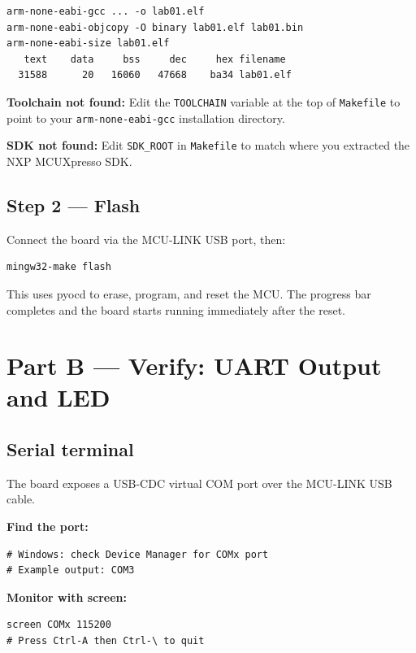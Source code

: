\documentclass[11pt, a4paper]{article}
\newcommand{\file}[1]{\texttt{\small #1}}
\begin{document}
\begin{lstlisting}[style=textstyle]
arm-none-eabi-gcc ... -o lab01.elf
arm-none-eabi-objcopy -O binary lab01.elf lab01.bin
arm-none-eabi-size lab01.elf
   text    data     bss     dec     hex filename
  31588      20   16060   47668    ba34 lab01.elf
\end{lstlisting}

\begin{warnbox}
  \textbf{Toolchain not found:} Edit the \texttt{TOOLCHAIN} variable at the top of
  \file{Makefile} to point to your \texttt{arm-none-eabi-gcc} installation directory.

  \medskip
  \textbf{SDK not found:} Edit \texttt{SDK\_ROOT} in \file{Makefile} to match
  where you extracted the NXP MCUXpresso SDK.
\end{warnbox}

\subsection{Step 2 --- Flash}

Connect the board via the MCU-LINK USB port, then:

\begin{lstlisting}[style=bashstyle]
mingw32-make flash
\end{lstlisting}

This uses pyocd to erase, program, and reset the MCU.
The progress bar completes and the board starts running immediately after the reset.

\section{Part B --- Verify: UART Output and LED}

\subsection{Serial terminal}

The board exposes a USB-CDC virtual COM port over the MCU-LINK USB cable.

\textbf{Find the port:}
\begin{lstlisting}[style=bashstyle]
# Windows: check Device Manager for COMx port
# Example output: COM3
\end{lstlisting}

\textbf{Monitor with screen:}
\begin{lstlisting}[style=bashstyle]
screen COMx 115200
# Press Ctrl-A then Ctrl-\ to quit
\end{lstlisting}
\end{document}
